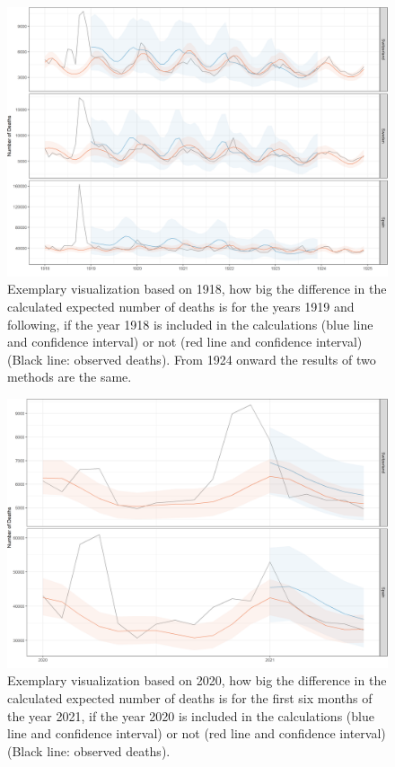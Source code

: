 \documentclass{article}
\begin{document}
	
	\begin{figure}[H]
		\centering	
		\includegraphics[width=\linewidth]{../Figure_S3a.png}
		\caption{Exemplary visualization based on 1918, how big the difference in the calculated expected number of deaths is for the years 1919 and following, if the year 1918 is included in the calculations (blue line and confidence interval) or not (red line and confidence interval) (Black line: observed deaths). From 1924 onward the results of two methods are the same. }
	\end{figure}
	
	\begin{figure}[H]
		\centering	
		\includegraphics[width=\linewidth]{../Figure_S3b.png}
		\caption{Exemplary visualization based on 2020, how big the difference in the calculated expected number of deaths is for the first six months of the year 2021, if the year 2020 is included in the calculations (blue line and confidence interval) or not (red line and confidence interval) (Black line: observed deaths). }
	\end{figure}
\end{document}
